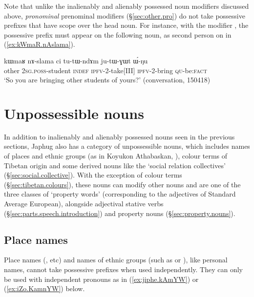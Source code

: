 Note that unlike the inalienably and alienably possessed noun modifiers discussed above, \textit{pronominal} prenominal modifiers (§\ref{sec:other.pro}) do not take possessive prefixes that have scope over the head noun. For instance, with the modifier , the possessive prefix must appear on the following noun, as second person  on  in (\ref{ex:kWmaR.nAslama}).

\begin{exe}
\ex \label{ex:kWmaR.nAslama}
 \gll  kɯmaʁ nɤ-slama ci tu-tɯ-ndɤm ju-tɯ-ɣɯt ɯ́-ŋu \\
 other \textsc{2sg}.\textsc{poss}-student \textsc{indef} \textsc{ipfv}-2-take[III] \textsc{ipfv}-2-bring \textsc{qu}-be:\textsc{fact} \\
 \glt `So you are bringing other students of yours?' (conversation, 150418)
\end{exe}

 

\section{Unpossessible nouns} \label{sec:unpossessible.nouns}
In addition to inalienably and alienably possessed nouns seen in the previous sections, Japhug also has a category of unpossessible nouns, which includes names of places and ethnic groups (as in Koyukon Athabaskan, \citealt[651]{thompson96koyukon}), colour terms of Tibetan origin and some derived nouns like the `social relation collectives' (§\ref{sec:social.collective}). With the exception of colour terms (§\ref{sec:tibetan.colours}), these nouns can modify other nouns and are one of the three classes of `property words' (corresponding to the adjectives of Standard Average European),  alongside adjectival stative verbs (§\ref{sec:parts.speech.introduction}) and property nouns (§\ref{sec:property.nouns}).

 

\subsection{Place names}  \label{sec:place.names}
Place names (,  etc) and names of ethnic groups (such as  or ), like personal names, cannot take possessive prefixes when used independently. They can only be used with independent pronouns as in (\ref{ex:jiphe.kAmYW}) or (\ref{ex:iZo.KamnYW}) below.

